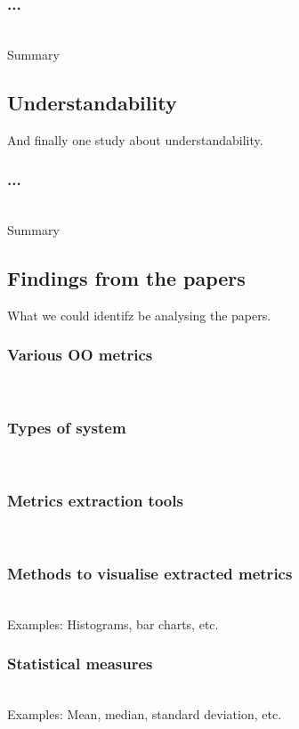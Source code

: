 \documentclass[conference]{IEEEtran}
\begin{document}
\subsubsection{...}\cite{...}\\
Summary

\subsection{Understandability}
And finally one study about understandability.\\

\subsubsection{...}\cite{...}\\
Summary

\subsection{Findings from the papers}
What we could identifz be analysing the papers.

\subsubsection{Various OO metrics}\\

\subsubsection{Types of system}\\

\subsubsection{Metrics extraction tools}\\

\subsubsection{Methods to visualise extracted metrics}\\
Examples: Histograms, bar charts, etc.

\subsubsection{Statistical measures}\\
Examples: Mean, median, standard deviation, etc.
\end{document}
